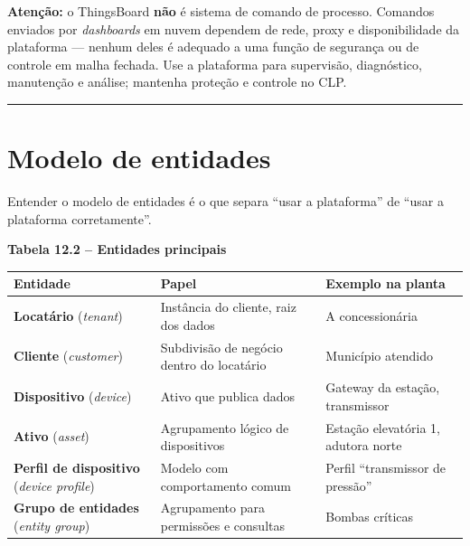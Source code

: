 \begin{caixaatencao}

\textbf{Atenção:} o ThingsBoard \textbf{não} é sistema de comando de processo. Comandos enviados por \emph{dashboards} em nuvem dependem de rede, proxy e disponibilidade da plataforma --- nenhum deles é adequado a uma função de segurança ou de controle em malha fechada. Use a plataforma para supervisão, diagnóstico, manutenção e análise; mantenha proteção e controle no CLP.

\end{caixaatencao}

\begin{center}\rule{0.5\linewidth}{0.5pt}\end{center}

\section{Modelo de entidades}\label{modelo-de-entidades}

Entender o modelo de entidades é o que separa ``usar a plataforma'' de ``usar a plataforma corretamente''.

\textbf{Tabela 12.2 -- Entidades principais}

\begin{longtable}[]{@{}
  >{\raggedright\arraybackslash}p{}
  >{\raggedright\arraybackslash}p{}
  >{\raggedright\arraybackslash}p{}@{}}
\toprule\noalign{}
\begin{minipage}[b]{\linewidth}\raggedright
Entidade
\end{minipage} & \begin{minipage}[b]{\linewidth}\raggedright
Papel
\end{minipage} & \begin{minipage}[b]{\linewidth}\raggedright
Exemplo na planta
\end{minipage} \\
\midrule\noalign{}
\endhead
\bottomrule\noalign{}
\endlastfoot
\textbf{Locatário} (\emph{tenant}) & Instância do cliente, raiz dos dados & A concessionária \\
\textbf{Cliente} (\emph{customer}) & Subdivisão de negócio dentro do locatário & Município atendido \\
\textbf{Dispositivo} (\emph{device}) & Ativo que publica dados & Gateway da estação, transmissor \\
\textbf{Ativo} (\emph{asset}) & Agrupamento lógico de dispositivos & Estação elevatória 1, adutora norte \\
\textbf{Perfil de dispositivo} (\emph{device profile}) & Modelo com comportamento comum & Perfil ``transmissor de pressão'' \\
\textbf{Grupo de entidades} (\emph{entity group}) & Agrupamento para permissões e consultas & Bombas críticas \\
\end{longtable}

